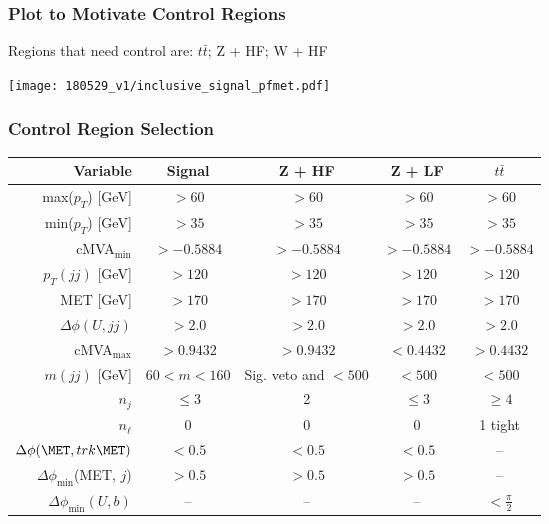\documentclass{beamer}
\begin{document}
\begin{frame}
  \frametitle{Plot to Motivate Control Regions}

  Regions that need control are:
  $t\bar{t}$;
  Z + HF;
  W + HF

  \vspace{12pt}

  \centering
  \texttt{[image: 180529\_v1/inclusive\_signal\_pfmet.pdf]}
\end{frame}

\begin{frame}
  \frametitle{Control Region Selection}
  \begin{center}
    {\scriptsize
      \begin{tabular}{r|cccc}
        \hline \hline
        Variable                        & Signal     & Z + HF     & Z + LF     & ${t\bar{t}}$ \\
        \hline
        max($p_T$) [GeV] & $>60$      & $>60$      & $>60$      & $>60$ \\
        min($p_T$) [GeV] & $>35$      & $>35$      & $>35$      & $>35$ \\
        cMVA$_{\mathrm{min}}$           & $>-0.5884$ & $>-0.5884$ & $>-0.5884$ & $>-0.5884$ \\
        $p_T(jj)$ [GeV]                 & $>120$     & $>120$     & $>120$     & $>120$ \\
        MET [GeV]                      & $>170$     & $>170$     & $>170$     & $>170$ \\
        $\Delta\phi(U, jj)$             & $>2.0$     & $>2.0$     & $>2.0$     & $>2.0$ \\
        \hline
        cMVA$_{\mathrm{max}}$           & $>0.9432$  & $>0.9432$  & $<0.4432$  & $>0.4432$ \\
        $m(jj)$ [GeV]                   & $60<m<160$ & Sig. veto and $<500$ & $<500$ & $<500$ \\
        $n_{j}$                         & $\le 3$    & 2          & $\le 3$    & $\ge 4$ \\
        $n_{\ell}$                      & 0          & 0          & 0          & 1 tight \\
        $\Delta\phi(\MET, trk\MET)$     & $<0.5$     & $<0.5$     & $<0.5$     & -- \\
        $\Delta\phi_{\mathrm{min}}$(MET, $j$) & $>0.5$   & $>0.5$     & $>0.5$     & -- \\
        $\Delta\phi_{\mathrm{min}}(U, b)$         & --         & --         & --         & $<\frac{\pi}{2}$ \\
        \hline\hline
      \end{tabular}
    }
  \end{center}
\end{frame}
\end{document}
